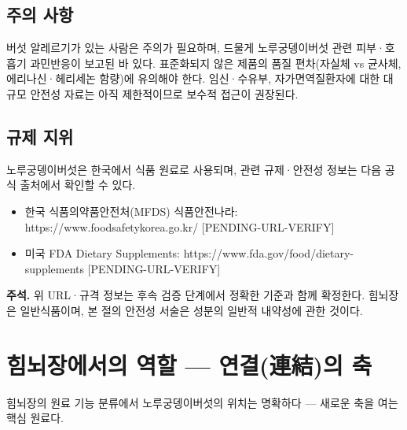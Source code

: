 \documentclass[11pt,oneside]{book}
\newenvironment{authnote}
  {\par\smallskip\begingroup\leftskip=7mm\rightskip=5mm\small\color{muted}\noindent\ignorespaces}
  {\par\endgroup\smallskip}
\begin{document}
\subsection{주의 사항}
버섯 알레르기가 있는 사람은 주의가 필요하며, 드물게 노루궁뎅이버섯 관련 피부·호흡기 과민반응이 보고된 바 있다. 표준화되지 않은 제품의 품질 편차(자실체 vs 균사체, 에리나신·헤리세논 함량)에 유의해야 한다. 임신·수유부, 자가면역질환자에 대한 대규모 안전성 자료는 아직 제한적이므로 보수적 접근이 권장된다.

\subsection{규제 지위}
노루궁뎅이버섯은 한국에서 식품 원료로 사용되며, 관련 규제·안전성 정보는 다음 공식 출처에서 확인할 수 있다.

\begin{itemize}[leftmargin=6mm,itemsep=1pt,topsep=2pt]
  \item 한국 식품의약품안전처(MFDS) 식품안전나라: https://www.foodsafetykorea.go.kr/ [PENDING-URL-VERIFY]
  \item 미국 FDA Dietary Supplements: https://www.fda.gov/food/dietary-supplements [PENDING-URL-VERIFY]
\end{itemize}
\begin{authnote}\textbf{주석.} 위 URL·규격 정보는 후속 검증 단계에서 정확한 기준과 함께 확정한다. 힘뇌장은 일반식품이며, 본 절의 안전성 서술은 성분의 일반적 내약성에 관한 것이다.\end{authnote}
\section{힘뇌장에서의 역할 — 연결(連結)의 축}
힘뇌장의 원료 기능 분류에서 노루궁뎅이버섯의 위치는 명확하다 — 새로운 축을 여는 핵심 원료다.

\vspace{2pt}\vspace{3pt}
\end{document}
